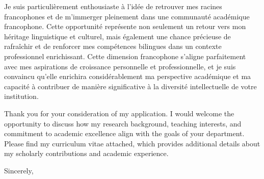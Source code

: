 \hspace{1.5em} Je suis particulièrement enthousiaste à l'idée de retrouver mes racines francophones et de m'immerger pleinement dans une communauté académique francophone. Cette opportunité représente non seulement un retour vers mon héritage linguistique et culturel, mais également une chance précieuse de rafraîchir et de renforcer mes compétences bilingues dans un contexte professionnel enrichissant. Cette dimension francophone s'aligne parfaitement avec mes aspirations de croissance personnelle et professionnelle, et je suis convaincu qu'elle enrichira considérablement ma perspective académique et ma capacité à contribuer de manière significative à la diversité intellectuelle de votre institution.
\vspace{1.0em}

\hspace{1.5em} Thank you for your consideration of my application. I would welcome the opportunity to discuss how my research background, teaching interests, and commitment to academic excellence align with the goals of your department. Please find my curriculum vitae attached, which provides additional details about my scholarly contributions and academic experience.
\vspace{1.0em}

Sincerely,\\
\myName\\[1.0em]

